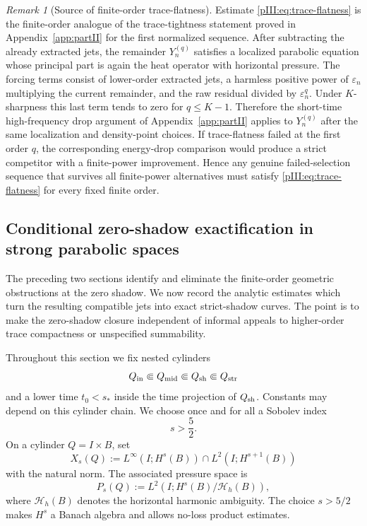 \documentclass[11pt]{article}
\numberwithin{equation}{section}
\theoremstyle{plain}
\theoremstyle{definition}
\theoremstyle{remark}
\newtheorem{remark}{Remark}[section]
\newcommand{\eps}{\varepsilon}
\begin{document}
\begin{remark}[Source of finite-order trace-flatness]
\label{pIII:rem:source-finite-order-trace-flatness}
Estimate \eqref{pIII:eq:trace-flatness} is the finite-order analogue of the trace-tightness
statement proved in Appendix~\ref{app:partII} for the first normalized sequence.  After subtracting the already
extracted jets, the remainder \(Y^{(q)}_n\) satisfies a localized parabolic equation whose
principal part is again the heat operator with horizontal pressure.  The forcing terms consist
of lower-order extracted jets, a harmless positive power of \(\eps_n\) multiplying the current
remainder, and the raw residual divided by \(\eps_n^q\).  Under \(K\)-sharpness this last
term tends to zero for \(q\le K-1\).  Therefore the short-time high-frequency drop argument
of Appendix~\ref{app:partII} applies to \(Y^{(q)}_n\) after the same localization and density-point choices.
If trace-flatness failed at the first order \(q\), the corresponding energy-drop comparison
would produce a strict competitor with a finite-power improvement.  Hence any genuine
failed-selection sequence that survives all finite-power alternatives must satisfy
\eqref{pIII:eq:trace-flatness} for every fixed finite order.
\end{remark}

\subsection{Conditional zero-shadow exactification in strong parabolic spaces}
\label{pIII:sec:summation}

The preceding two sections identify and eliminate the finite-order geometric obstructions at the zero
shadow.  We now record the analytic estimates which turn the resulting compatible jets into exact
strict-shadow curves.  The point is to make the zero-shadow closure independent of informal appeals
to higher-order trace compactness or unspecified summability.

Throughout this section we fix nested cylinders
\[
        Q_{\rm in}\Subset Q_{\rm mid}\Subset Q_{\rm sh}\Subset Q_{\rm str}
\]
and a lower time \(t_0<s_*\) inside the time projection of \(Q_{\rm sh}\).  Constants may depend on
this cylinder chain.  We choose once and for all a Sobolev index
\[
        s>\frac52.
\]
On a cylinder \(Q=I\times B\), set
\[
        X_s(Q):=L^\infty(I;H^s(B))\cap L^2(I;H^{s+1}(B))
\]
with the natural norm.  The associated pressure space is
\[
        P_s(Q):=L^2(I;H^s(B)/\mathcal H_h(B)),
\]
where \(\mathcal H_h(B)\) denotes the horizontal harmonic ambiguity.  The choice \(s>5/2\) makes
\(H^s\) a Banach algebra and allows no-loss product estimates.
\end{document}
